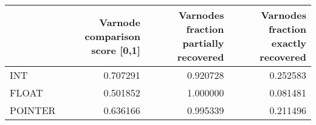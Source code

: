 \begin{tabular}{lrrr}
\toprule
{} &  Varnode comparison score [0,1] &  Varnodes fraction partially recovered &  Varnodes fraction exactly recovered \\
\midrule
INT     &                        0.707291 &                               0.920728 &                             0.252583 \\
FLOAT   &                        0.501852 &                               1.000000 &                             0.081481 \\
POINTER &                        0.636166 &                               0.995339 &                             0.211496 \\
\bottomrule
\end{tabular}
